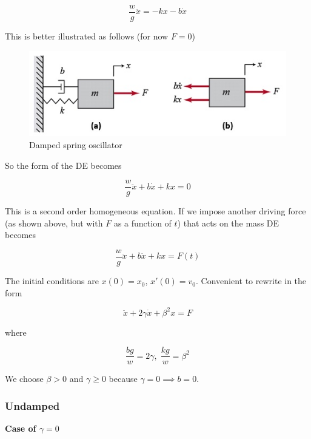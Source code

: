 \begin{equation}
    \frac{w}{g}\ddot x=-kx-b\dot x
\end{equation}

This is better illustrated as follows (for now $F=0$)

\begin{figure}[H]
    \centering
    \includegraphics[scale=0.6]{figures/a-Mass-Spring-Damper-System-b-free-body-diagram.jpg}
    \caption{Damped spring oscillator}
\end{figure}

So the form of the DE becomes

\begin{equation}
    \frac{w}{g}\ddot x+b\dot x+kx=0
\end{equation}

This is a second order homogeneous equation. If we impose another driving force (as shown above, but with $F$ as a function of $t$) that acts on the mass DE becomes

\begin{equation}
    \frac{w}{g}\ddot x+b\dot x+kx=F(t)
\end{equation}

The initial conditions are $x(0)=x_0$, $x'(0)=v_0$. Convenient to rewrite in the form

\begin{equation}
    \ddot x+2\gamma \dot x+\beta^2 x = F
\end{equation}

where

\begin{equation}
    \frac{bg}{w}=2\gamma,\; \frac{kg}{w}=\beta^2
\end{equation}

We choose $\beta>0$ and $\gamma \geq 0$ because $\gamma = 0\implies b=0$.

\subsubsection{Undamped}

\textbf{Case of $\gamma = 0$}

